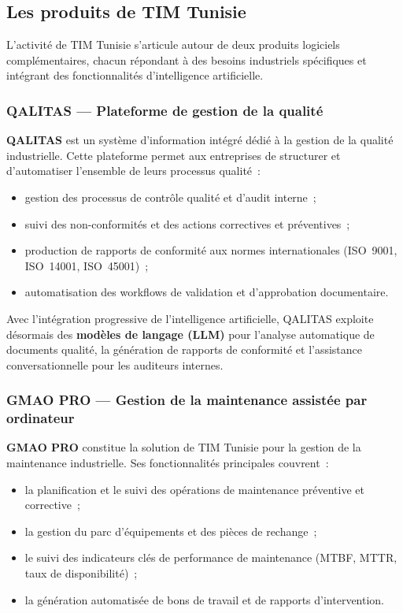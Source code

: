 \subsection{Les produits de TIM Tunisie}

L'activité de TIM Tunisie s'articule autour de deux produits logiciels complémentaires, chacun répondant à des besoins industriels spécifiques et intégrant des fonctionnalités d'intelligence artificielle.

\subsubsection{QALITAS --- Plateforme de gestion de la qualité}

\textbf{QALITAS} est un système d'information intégré dédié à la gestion de la qualité industrielle. Cette plateforme permet aux entreprises de structurer et d'automatiser l'ensemble de leurs processus qualité~:

\begin{itemize}[noitemsep]
    \item gestion des processus de contrôle qualité et d'audit interne~;
    \item suivi des non-conformités et des actions correctives et préventives~;
    \item production de rapports de conformité aux normes internationales (ISO~9001, ISO~14001, ISO~45001)~;
    \item automatisation des workflows de validation et d'approbation documentaire.
\end{itemize}

Avec l'intégration progressive de l'intelligence artificielle, QALITAS exploite désormais des \textbf{modèles de langage (LLM)} pour l'analyse automatique de documents qualité, la génération de rapports de conformité et l'assistance conversationnelle pour les auditeurs internes.

\subsubsection{GMAO PRO --- Gestion de la maintenance assistée par ordinateur}

\textbf{GMAO PRO} constitue la solution de TIM Tunisie pour la gestion de la maintenance industrielle. Ses fonctionnalités principales couvrent~:

\begin{itemize}[noitemsep]
    \item la planification et le suivi des opérations de maintenance préventive et corrective~;
    \item la gestion du parc d'équipements et des pièces de rechange~;
    \item le suivi des indicateurs clés de performance de maintenance (MTBF, MTTR, taux de disponibilité)~;
    \item la génération automatisée de bons de travail et de rapports d'intervention.
\end{itemize}

